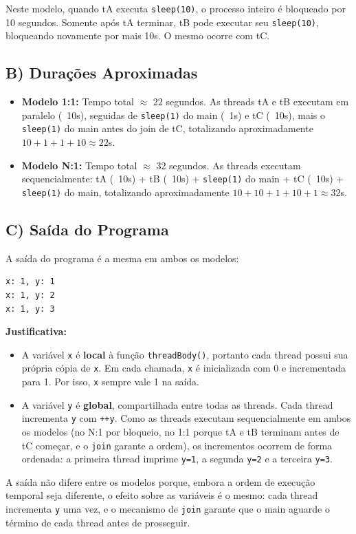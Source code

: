 \documentclass[11pt]{ifscarticle}
\begin{document}
    Neste modelo, quando tA executa \texttt{sleep(10)}, o processo inteiro é bloqueado por 10 segundos. Somente após tA terminar, tB pode executar seu \texttt{sleep(10)}, bloqueando novamente por mais 10s. O mesmo ocorre com tC.

    \subsection{B) Durações Aproximadas}

    \begin{itemize}
        \item \textbf{Modelo 1:1:} Tempo total $\approx$ 22 segundos. As threads tA e tB executam em paralelo (~10s), seguidas de \texttt{sleep(1)} do main (~1s) e tC (~10s), mais o \texttt{sleep(1)} do main antes do join de tC, totalizando aproximadamente $10 + 1 + 1 + 10 \approx 22$s.
        \item \textbf{Modelo N:1:} Tempo total $\approx$ 32 segundos. As threads executam sequencialmente: tA (~10s) + tB (~10s) + \texttt{sleep(1)} do main + tC (~10s) + \texttt{sleep(1)} do main, totalizando aproximadamente $10 + 10 + 1 + 10 + 1 \approx 32$s.
    \end{itemize}

    \subsection{C) Saída do Programa}

    A saída do programa é a mesma em ambos os modelos:

    \begin{verbatim}
x: 1, y: 1
x: 1, y: 2
x: 1, y: 3
    \end{verbatim}

    \textbf{Justificativa:}

    \begin{itemize}
        \item A variável \texttt{x} é \textbf{local} à função \texttt{threadBody()}, portanto cada thread possui sua própria cópia de \texttt{x}. Em cada chamada, \texttt{x} é inicializada com 0 e incrementada para 1. Por isso, \texttt{x} sempre vale 1 na saída.
        \item A variável \texttt{y} é \textbf{global}, compartilhada entre todas as threads. Cada thread incrementa \texttt{y} com \texttt{++y}. Como as threads executam sequencialmente em ambos os modelos (no N:1 por bloqueio, no 1:1 porque tA e tB terminam antes de tC começar, e o \texttt{join} garante a ordem), os incrementos ocorrem de forma ordenada: a primeira thread imprime \texttt{y=1}, a segunda \texttt{y=2} e a terceira \texttt{y=3}.
    \end{itemize}

    A saída não difere entre os modelos porque, embora a ordem de execução temporal seja diferente, o efeito sobre as variáveis é o mesmo: cada thread incrementa \texttt{y} uma vez, e o mecanismo de \texttt{join} garante que o main aguarde o término de cada thread antes de prosseguir.
\end{document}
